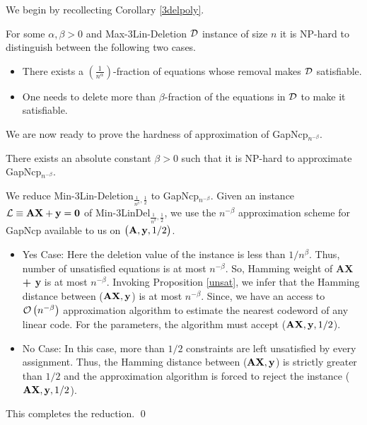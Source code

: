
We begin by recollecting Corollary \ref{3delpoly}.

\begin{col}
  For some $\alpha, \beta > 0$ and {\sc Max-3Lin-Deletion} ${\cal D}$
  instance of size $n$ it is {\sf NP}-hard to distinguish between the
  following two cases.
\begin{itemize}
\item There exists a $\left(\frac{1}{n^\alpha}\right)$-fraction of equations
  whose removal makes ${\cal D}$ satisfiable.
\item One needs to delete more than $\beta$-fraction of the equations
  in ${\cal D}$ to make it satisfiable.
\end{itemize}
\end{col}

\noindent We are now ready to prove the hardness of approximation of
{\sc GapNcp}$_{n^{-\beta}}$.

\begin{theorem}
  There exists an absolute constant $\beta > 0$ such that it is {\sf
    NP}-hard to approximate {\sc GapNcp}$_{n^{-\beta}}$.
\end{theorem}
 We reduce {\sc
  Min-3Lin-Deletion}$_{\frac{1}{n^{\beta}}, \frac{1}{2}}$ to {\sc
  {Gap}{Ncp}}$_{n^{-\beta}}$.  Given an instance ${\cal L} \equiv {\bf AX +
  y = 0}$ of {\sc Min-3LinDel}$_{\frac{1}{n^{\beta}}, \frac{1}{2}}$,
we use the $n^{-\beta}$ approximation scheme for {\sc GapNcp}
available to us on $\left({\bf A, y}, 1/2\right)$.
\begin{itemize}
\item {\sf Yes Case:} Here the deletion value of the instance is less
  than $1/n^{\beta}$. Thus, number of unsatisfied equations is at most
  $n^{-\beta}$. So, Hamming weight of {\bf AX + y} is at most $
  n^{-\beta}$. Invoking Proposition \ref{unsat}, we infer that the
  Hamming distance between (${\bf AX, y}$) is at most
  $n^{-\beta}$. Since, we have an access to ${\cal
    O}\left(n^{-\beta}\right)$ approximation algorithm to estimate the
  nearest codeword of any linear code. For the parameters, the
  algorithm must accept (${\bf AX, y}, 1/2$).

\item {\sf No Case:} In this case, more than $1/2$ constraints are
 left unsatisfied by every assignment. Thus, the Hamming distance between
  (${\bf AX, y}$) is strictly greater than $1/2$ and the approximation
  algorithm is forced to reject the instance (${\bf AX, y}, 1/2$).
\end{itemize}
This completes the reduction. \qed













